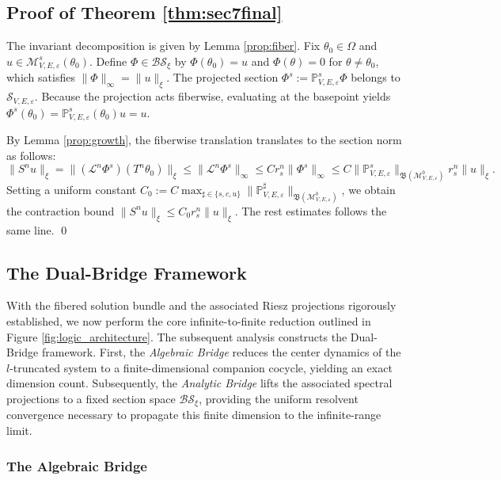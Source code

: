 \documentclass[reqno,11pt]{amsart}
\begin{document}
\subsection{Proof of Theorem \ref{thm:sec7final}}

The invariant decomposition is given by Lemma  \ref{prop:fiber}. Fix $\theta_0 \in \Omega$ and $u\in \mathcal{M}_{V,E,\varepsilon}^s(\theta_0)$. Define $\Phi \in \mathcal{BS}_\xi$ by $\Phi(\theta_0) = u$ and $\Phi(\theta) = 0$ for $\theta \neq \theta_0$, which satisfies $\|\Phi\|_\infty = \|u\|_\xi$. The projected section $\Phi^s := \mathbb{P}^s_{V,E,\varepsilon}\Phi$ belongs to $\mathcal{S}_{V,E,\varepsilon}$. Because the projection acts fiberwise, evaluating at the basepoint yields $\Phi^s(\theta_0) = \mathbb{P}^s_{V,E,\varepsilon}(\theta_0)u = u$.

By Lemma \ref{prop:growth}, the fiberwise translation translates to the section norm as follows:
$$
\|S^n u\|_\xi = \bigl\|(\mathcal{L}^n\Phi^s)(T^n\theta_0)\bigr\|_\xi \leq \|\mathcal{L}^n\Phi^s\|_\infty \leq C r_s^n\|\Phi^s\|_\infty \leq C\|\mathbb{P}^s_{V,E,\varepsilon}\|_{\mathfrak{B}(\mathcal{M}_{V,E,\varepsilon}^b)} r_s^n\|u\|_\xi.
$$
Setting a uniform constant $C_0 := C \max_{\sharp \in \{s,c,u\}} \|\mathbb{P}^\sharp_{V,E,\varepsilon}\|_{\mathfrak{B}(\mathcal{M}_{V,E,\varepsilon}^b)}$, we obtain the contraction bound $\|S^n u\|_\xi \le C_0 r_s^n \|u\|_\xi$. The rest estimates follows the same line.  \qed


\subsection{The Dual-Bridge Framework}
With the fibered solution bundle and the associated Riesz projections rigorously established, we now perform the core infinite-to-finite reduction outlined in Figure \ref{fig:logic_architecture}. The subsequent analysis constructs the Dual-Bridge framework. First, the \emph{Algebraic Bridge}  reduces the center dynamics of the $l$-truncated system to a finite-dimensional companion cocycle, yielding an exact dimension count. Subsequently, the \emph{Analytic Bridge} lifts the associated spectral projections to a fixed section space $\mathcal{BS}_\xi$, providing the uniform resolvent convergence necessary to propagate this finite dimension to the infinite-range limit.



\subsubsection{The Algebraic Bridge}
\end{document}
